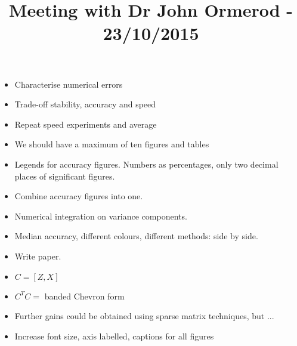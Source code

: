 \documentclass{amsart}
\title{Meeting with Dr John Ormerod - 23/10/2015}
\begin{document}
\maketitle

\begin{itemize}
\item Characterise numerical errors
\item Trade-off stability, accuracy and speed
\item Repeat speed experiments and average
\item We should have a maximum of ten figures and tables
\item Legends for accuracy figures. Numbers as percentages, only two decimal places of significant figures.
\item Combine accuracy figures into one.
\item Numerical integration on variance components.
\item Median accuracy, different colours, different methods: side by side.
\item Write paper.
\item $C=[Z, X]$
\item $C^T C = $ banded Chevron form
\item Further gains could be obtained using sparse matrix techniques, but ...
\item Increase font size, axis labelled, captions for all figures
\end{itemize}
\end{document}
